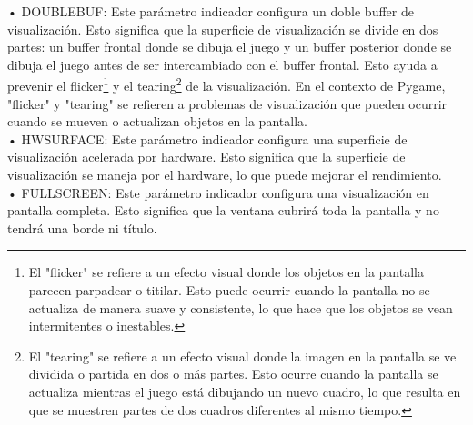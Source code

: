 • {\ttfamily DOUBLEBUF}: Este parámetro indicador configura un doble buffer de visualización. Esto significa que la superficie de visualización se divide en dos partes: un buffer frontal donde se dibuja el juego y un buffer posterior donde se dibuja el juego antes de ser intercambiado con el buffer frontal. Esto ayuda a prevenir el {\ttfamily flicker}\footnote{El "{}flicker"{} { } se refiere a un efecto visual donde los objetos en la pantalla parecen parpadear o titilar. Esto puede ocurrir cuando la pantalla no se actualiza de manera suave y consistente, lo que hace que los objetos se vean intermitentes o inestables.}  y el  {\ttfamily tearing}{\footnote{El "{}tearing"{} { } se refiere a un efecto visual donde la imagen en la pantalla se ve dividida o partida en dos o más partes. Esto ocurre cuando la pantalla se actualiza mientras el juego está dibujando un nuevo cuadro, lo que resulta en que se muestren partes de dos cuadros diferentes al mismo tiempo.} de la visualización. En el contexto de Pygame, "{}flicker"{} y "{}tearing"{} se refieren a problemas de visualización que pueden ocurrir cuando se mueven o actualizan objetos en la pantalla.\\

• {\ttfamily HWSURFACE}: Este parámetro indicador configura una superficie de visualización acelerada por hardware. Esto significa que la superficie de visualización se maneja por el hardware, lo que puede mejorar el rendimiento.\\

• {\ttfamily FULLSCREEN}: Este parámetro indicador configura una visualización en pantalla completa. Esto significa que la ventana cubrirá toda la pantalla y no tendrá una borde ni título.\\







}
